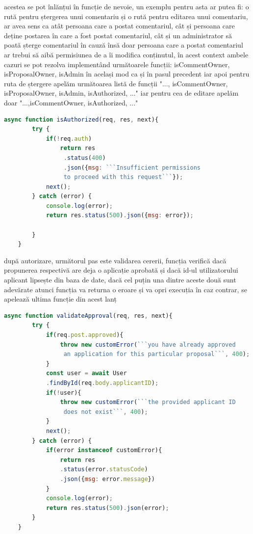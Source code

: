 \documentclass[12pt,a4paper,hidelinks]{report}
\theoremstyle{definition}
\theoremstyle{remark}
\begin{document}
    acestea se pot înlănțui în funcție de nevoie, un exemplu pentru asta ar putea fi: o rută pentru ștergerea unui comentariu
    și o rută pentru editarea unui comentariu, ar avea sens ca atât persoana care a postat comentariul, 
    cât și persoana care deține postarea în care a fost postat comentariul, cât și un administrator să poată șterge comentariul în cauză 
    însă doar persoana care a postat comentariul ar trebui să aibă permisiunea de a îi modifica conținutul, în acest context
    ambele cazuri se pot rezolva implementând următoarele funcții: isCommentOwner, isProposalOwner, isAdmin în același mod ca și în pasul precedent
    iar apoi pentru ruta de ștergere apelăm următoarea listă de funcții "..., isCommentOwner, isProposalOwner, isAdmin, isAuthorized, ..."
    iar pentru cea de editare apelăm doar "...,isCommentOwner, isAuthorized, ..."
    \begin{lstlisting}[language=Javascript]
        async function isAuthorized(req, res, next){
        try {
            if(!req.auth)
                return res
                 .status(400)
                 .json({msg: ```Insufficient permissions
                 to proceed with this request```});
            next();
        } catch (error) {
            console.log(error);
            return res.status(500).json({msg: error});
            
        }
    }
    \end{lstlisting}
    după autorizare, următorul pas este validarea cererii, funcția verifică dacă propunerea respectivă are deja o aplicație aprobată
    și dacă id-ul utilizatorului aplicant lipsește din baza de date, dacă cel puțin una dintre aceste două sunt adevărate atunci funcția va returna o eroare și va opri execuția
    în caz contrar, se apelează ultima funcție din acest lanț
    \begin{lstlisting}[language=Javascript]
        async function validateApproval(req, res, next){
        try {
            if(req.post.approved){
                throw new customError(```you have already approved
                 an application for this particular proposal```, 400);
            }
            const user = await User
            .findById(req.body.applicantID);
            if(!user){
                throw new customError(```the provided applicant ID
                 does not exist```, 400);
            }
            next();
        } catch (error) {
            if(error instanceof customError){
                return res
                .status(error.statusCode)
                .json({msg: error.message})
            }
            console.log(error);
            return res.status(500).json(error);   
        }
    }
    \end{lstlisting}
\end{document}
